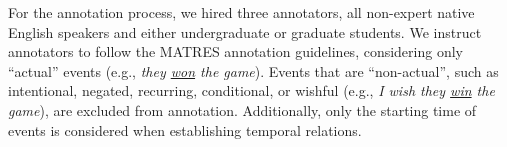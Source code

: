 


For the annotation process, we hired three annotators, all non-expert native English speakers and either undergraduate or graduate students. We instruct annotators to follow the MATRES annotation guidelines, considering only ``actual'' events (e.g., \textit{they \underline{won} the game}). Events that are ``non-actual'', such as intentional, negated, recurring, conditional, or wishful (e.g., \textit{I wish they \underline{win} the game}), are excluded from annotation. Additionally, only the starting time of events is considered when establishing temporal relations.


